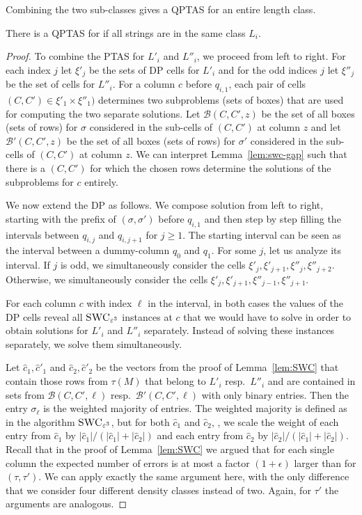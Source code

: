 Combining the two sub-classes gives a QPTAS for an entire length class.
\begin{lemma}\label{lem:length-class}
    There is a QPTAS for \GMEC if all strings are in the same class $L_i$.
\end{lemma}
\begin{proof}
    To combine the PTAS for $L'_i$ and $L''_i$, we proceed from left to right.
    For each index $j$ let $\xi'_j$ be the sets of DP cells for $L'_i$ and for the odd indices $j$ let $\xi''_j$ be the set of cells for $L''_i$.
    For a column $c$ before $q_{i,1}$, each pair of cells $(C,C') \in \xi'_1 \times \xi''_1)$ determines two subproblems (sets of boxes) that are used for computing the two separate solutions.
    Let $\mathcal{B}(C,C',z)$ be the set of all boxes (sets of rows) for $\sigma$ considered in the sub-cells of $(C,C')$ at column $z$ and
    let $\mathcal{B}'(C,C',z)$ be the set of all boxes (sets of rows) for $\sigma'$ considered in the sub-cells of $(C,C')$ at column $z$. 
    We can interpret Lemma~\ref{lem:swc-gap} such that there is a $(C,C')$ for which the chosen rows determine the solutions of the subproblems for $c$ entirely.

    We now extend the DP as follows.
    We compose solution from left to right, starting with the prefix of $(\sigma,\sigma')$ before $q_{i,1}$ and then step by step filling the intervals between $q_{i,j}$ and $q_{i,j+1}$ for $j \ge 1$.
    The starting interval can be seen as the interval between a dummy-column $q_0$ and $q_1$.
    For some $j$, let us analyze its interval. 
    If $j$ is odd, we simultaneously consider the cells $\xi'_j,\xi'_{j+1},\xi''_j, \xi''_{j+2}$.
    Otherwise, we simultaneously consider the cells $\xi'_j,\xi'_{j+1},\xi''_{j-1}, \xi''_{j+1}$.

    For each column $c$ with index $\ell$ in the interval, in both cases the values of the DP cells reveal all $\textsc{SWC}_{\varepsilon^3}$ instances at $c$ that we would have to solve in order to obtain solutions for $L'_i$ and $L''_i$ separately.
    Instead of solving these instances separately, we solve them simultaneously.

    Let $\hat{c}_1, \hat{c}'_1$ and $\hat{c}_2,\hat{c}'_2$ be the vectors from the proof of Lemma~\ref{lem:SWC} that contain those rows from $\tau(M)$ that belong to $L'_i$ resp.\ $L''_i$ and are contained in sets  
    from $\mathcal{B}(C,C',\ell)$ resp.~$\mathcal{B}'(C,C',\ell)$ with only binary entries.
    Then the entry $\sigma_\ell$ is the weighted majority of entries.
    The weighted majority is defined as in the algorithm $\textsc{SWC}_{\varepsilon^3}$, but for both $\hat{c}_1$ and $\hat{c}_2$, \ie, we scale the weight of each entry from $\hat{c}_1$ by $|\hat{c}_1|/(|\hat{c}_1| + |\hat{c}_2|)$
    and each entry from  $\hat{c}_2$ by $|\hat{c}_2|/(|\hat{c}_1| + |\hat{c}_2|)$.
    Recall that in the proof of Lemma~\ref{lem:SWC} we argued that for each single column the expected number of errors is at most a factor $(1+\epsilon)$ larger than for $(\tau,\tau')$.
    We can apply exactly the same argument here, with the only difference that we consider four different density classes instead of two.
    Again, for $\tau'$ the arguments are analogous.


\end{proof}
